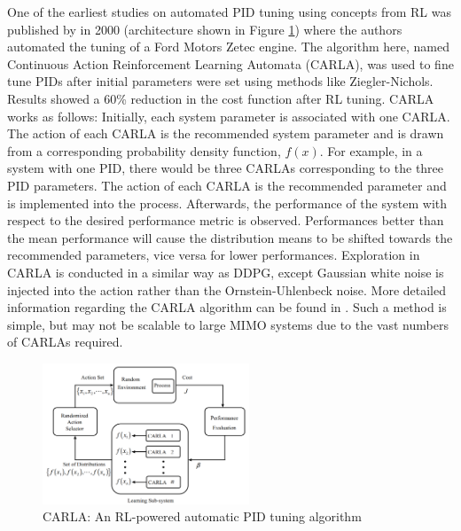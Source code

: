 One of the earliest studies on automated PID tuning using concepts from RL was published by \cite{pid1} in 2000 (architecture shown in Figure \ref{fig: CARLA}) where the authors automated the tuning of a Ford Motors Zetec engine. The algorithm here, named Continuous Action Reinforcement Learning Automata (CARLA), was used to fine tune PIDs after initial parameters were set using methods like Ziegler-Nichols.  Results showed a 60\% reduction in the cost function after RL tuning.  CARLA works as follows: Initially, each system parameter is associated with one CARLA.  The action of each CARLA is the recommended system parameter and is drawn from a corresponding probability density function, $f(x)$.  For example, in a system with one PID, there would be three CARLAs corresponding to the three PID parameters. The action of each CARLA is the recommended parameter and is implemented into the process.  Afterwards, the performance of the system with respect to the desired performance metric is observed.  Performances better than the mean performance will cause the distribution means to be shifted towards the recommended parameters, vice versa for lower performances. Exploration in CARLA is conducted in a similar way as DDPG, except Gaussian white noise is injected into the action rather than the Ornstein-Uhlenbeck noise. More detailed information regarding the CARLA algorithm can be found in \cite{pid1}. Such a method is simple, but may not be scalable to large MIMO systems due to the vast numbers of CARLAs required.

\begin{figure}[H]
    \centering
    \includegraphics[width=0.55\textwidth]{images/ch5/CARLA.jpeg}
    \caption{CARLA: An RL-powered automatic PID tuning algorithm}
    \label{fig: CARLA}
\end{figure}

